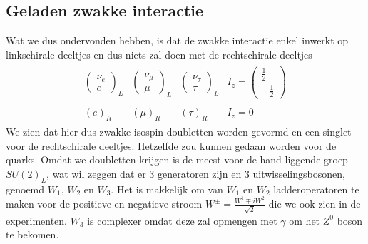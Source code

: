 \documentclass[../main.tex]{subfiles}
\begin{document}
\subsection{Geladen zwakke interactie}%
\label{sub:geladen_zwakke_interactie}

Wat we dus ondervonden hebben, is dat de zwakke interactie enkel inwerkt op linkschirale deeltjes en dus niets zal doen met de rechtschirale deeltjes
\begin{equation}
    \begin{aligned}
        \label{eq:zwakke_families}
        \begin{matrix}
            \begin{pmatrix}
                \nu_e\\
                e
            \end{pmatrix}_L &
            \begin{pmatrix}
                \nu_\mu\\
                \mu
            \end{pmatrix}_L &
            \begin{pmatrix}
                \nu_\tau\\
                \tau
            \end{pmatrix}_L &
            I_z=
            \begin{pmatrix}
                \frac{1}{2}\\
                -\frac{1}{2}
            \end{pmatrix}\\
            &&&\\
        (e)_R & (\mu)_R & (\tau)_R & I_z = 0
        \end{matrix}
    \end{aligned}
\end{equation}
We zien dat hier dus zwakke isospin doubletten worden gevormd en een singlet voor de rechtschirale deeltjes. Hetzelfde zou kunnen gedaan worden voor de quarks. Omdat we doubletten krijgen is de meest voor de hand liggende groep $SU(2)_L$, wat wil zeggen dat er 3 generatoren zijn en 3 uitwisselingsbosonen, genoemd $W_1$, $W_2$ en $W_3$. Het is makkelijk om van $W_1$ en $W_2$ ladderoperatoren te maken voor de positieve en negatieve stroom $W^\pm = \frac{W^1\mp iW^2}{\sqrt{2}}$ die we ook zien in de experimenten. $W_3$ is complexer omdat deze zal opmengen met $\gamma$ om het $Z^0$ boson te bekomen.
\end{document}
